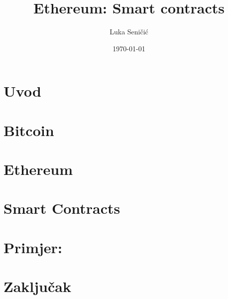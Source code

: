 \documentclass[12pt]{report}
\title{Ethereum: Smart contracts}
\author{Luka Seničić}
\date{\today}
\begin{document}
\maketitle

\tableofcontents

\chapter{Uvod}

\chapter{Bitcoin}

\chapter{Ethereum}

\chapter{Smart Contracts}

\chapter{Primjer:}

\chapter{Zaključak}
\end{document}

